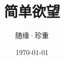 \documentclass[a4paper,UTF8]{ctexbook}
\begin{document}



\title{简单欲望}
\author{随缘·珍重}
\date{\today}
\maketitle

\setcounter{tocdepth}{2}
\tableofcontents










\end{document}
